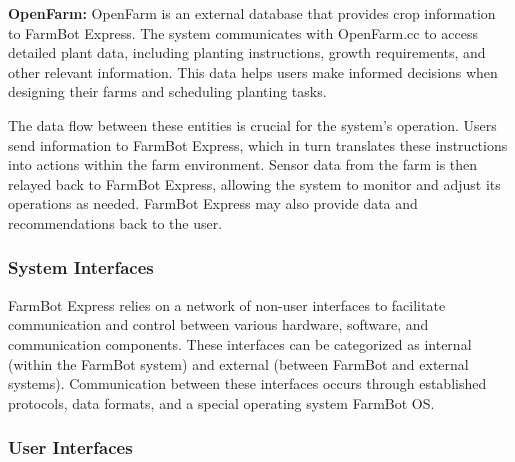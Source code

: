\textbf{OpenFarm:} OpenFarm is an external database that provides crop information to FarmBot Express. The system communicates with OpenFarm.cc to access detailed plant data, including planting instructions, growth requirements, and other relevant information. This data helps users make informed decisions when designing their farms and scheduling planting tasks.

The data flow between these entities is crucial for the system's operation. Users send information to FarmBot Express, which in turn translates these instructions into actions within the farm environment. Sensor data from the farm is then relayed back to FarmBot Express, allowing the system to monitor and adjust its operations as needed. FarmBot Express may also provide data and recommendations back to the user.


\subsubsection{System Interfaces}

FarmBot Express relies on a network of non-user interfaces to facilitate communication and control between various hardware, software, and communication components. These interfaces can be categorized as internal (within the FarmBot system) and external (between FarmBot and external systems). Communication between these interfaces occurs through established protocols, data formats, and a special operating system FarmBot OS.

\subsubsection{User Interfaces}

